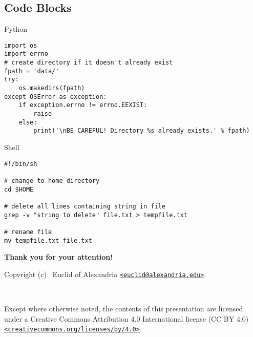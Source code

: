 \documentclass[aspectratio=169,xcolor={svgnames}]{beamer}
\begin{document}
\subsection{Code Blocks}
\begin{frame}{\insertsubsectionhead}
\begin{exampleblock}{Python}
\begin{lstlisting}[style=py]
import os
import errno
# create directory if it doesn't already exist
fpath = 'data/'
try:
    os.makedirs(fpath)
except OSError as exception:
    if exception.errno != errno.EEXIST:
        raise
    else:
        print('\nBE CAREFUL! Directory %s already exists.' % fpath)
\end{lstlisting}
\end{exampleblock}

\begin{exampleblock}{Shell}
\begin{lstlisting}[style=sh]
#!/bin/sh

# change to home directory
cd $HOME

# delete all lines containing string in file
grep -v "string to delete" file.txt > tempfile.txt

# rename file
mv tempfile.txt file.txt
\end{lstlisting}
\end{exampleblock}
\end{frame}

\appendix

\begin{frame}
  \textbf{\LARGE Thank you for your attention!}

  \vspace{16pt}
  Copyright (c) \the\year\ Euclid of Alexandria
  \href{mailto:euclid@alexandria.edu}{\texttt{<euclid@alexandria.edu>}}.

  \vspace{8pt}
  {\Huge\faCreativeCommons\ \faCreativeCommonsBy}

  Except where otherwise noted, the contents of this presentation are licensed
  under a Creative Commons Attribution 4.0 International license (CC BY 4.0)
  \href{https://creativecommons.org/licenses/by/4.0/}
  {\texttt{<creativecommons.org/licenses/by/4.0>}}.
\end{frame}
\end{document}
